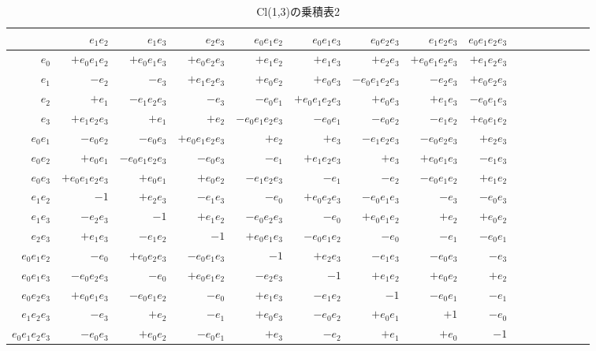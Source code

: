 \documentclass[a4paper,12pt,notitlepage]{jsreport}
\begin{document}
\begin{table}[ht]
  \begin{center}
    \caption{Cl(1,3)の乗積表2}
    \small
    \begin{tabular}{r|rrrrrrrrrrrrrrr}
      &$e_1e_2$&$e_1e_3$&$e_2e_3$&$e_0e_1e_2$&$e_0e_1e_3$&$e_0e_2e_3$&$e_1e_2e_3$&$e_0e_1e_2e_3$\\\hline
      $e_0$&$+e_0e_1e_2$&$+e_0e_1e_3$&$+e_0e_2e_3$&$+e_1e_2$&$+e_1e_3$&$+e_2e_3$&$+e_0e_1e_2e_3$&$+e_1e_2e_3$\\
      $e_1$&$-e_2$&$-e_3$&$+e_1e_2e_3$&$+e_0e_2$&$+e_0e_3$&$-e_0e_1e_2e_3$&$-e_2e_3$&$+e_0e_2e_3$\\
      $e_2$&$+e_1$&$-e_1e_2e_3$&$-e_3$&$-e_0e_1$&$+e_0e_1e_2e_3$&$+e_0e_3$&$+e_1e_3$&$-e_0e_1e_3$\\
      $e_3$&$+e_1e_2e_3$&$+e_1$&$+e_2$&$-e_0e_1e_2e_3$&$-e_0e_1$&$-e_0e_2$&$-e_1e_2$&$+e_0e_1e_2$\\
      $e_0e_1$&$-e_0e_2$&$-e_0e_3$&$+e_0e_1e_2e_3$&$+e_2$&$+e_3$&$-e_1e_2e_3$&$-e_0e_2e_3$&$+e_2e_3$\\
      $e_0e_2$&$+e_0e_1$&$-e_0e_1e_2e_3$&$-e_0e_3$&$-e_1$&$+e_1e_2e_3$&$+e_3$&$+e_0e_1e_3$&$-e_1e_3$\\
      $e_0e_3$&$+e_0e_1e_2e_3$&$+e_0e_1$&$+e_0e_2$&$-e_1e_2e_3$&$-e_1$&$-e_2$&$-e_0e_1e_2$&$+e_1e_2$\\
      $e_1e_2$&$-1$&$+e_2e_3$&$-e_1e_3$&$-e_0$&$+e_0e_2e_3$&$-e_0e_1e_3$&$-e_3$&$-e_0e_3$\\
      $e_1e_3$&$-e_2e_3$&$-1$&$+e_1e_2$&$-e_0e_2e_3$&$-e_0$&$+e_0e_1e_2$&$+e_2$&$+e_0e_2$\\
      $e_2e_3$&$+e_1e_3$&$-e_1e_2$&$-1$&$+e_0e_1e_3$&$-e_0e_1e_2$&$-e_0$&$-e_1$&$-e_0e_1$\\
      $e_0e_1e_2$&$-e_0$&$+e_0e_2e_3$&$-e_0e_1e_3$&$-1$&$+e_2e_3$&$-e_1e_3$&$-e_0e_3$&$-e_3$\\
      $e_0e_1e_3$&$-e_0e_2e_3$&$-e_0$&$+e_0e_1e_2$&$-e_2e_3$&$-1$&$+e_1e_2$&$+e_0e_2$&$+e_2$\\
      $e_0e_2e_3$&$+e_0e_1e_3$&$-e_0e_1e_2$&$-e_0$&$+e_1e_3$&$-e_1e_2$&$-1$&$-e_0e_1$&$-e_1$\\
      $e_1e_2e_3$&$-e_3$&$+e_2$&$-e_1$&$+e_0e_3$&$-e_0e_2$&$+e_0e_1$&$+1$&$-e_0$\\
      $e_0e_1e_2e_3$&$-e_0e_3$&$+e_0e_2$&$-e_0e_1$&$+e_3$&$-e_2$&$+e_1$&$+e_0$&$-1$\\
    \end{tabular}
  \end{center}
\end{table}
\end{document}
